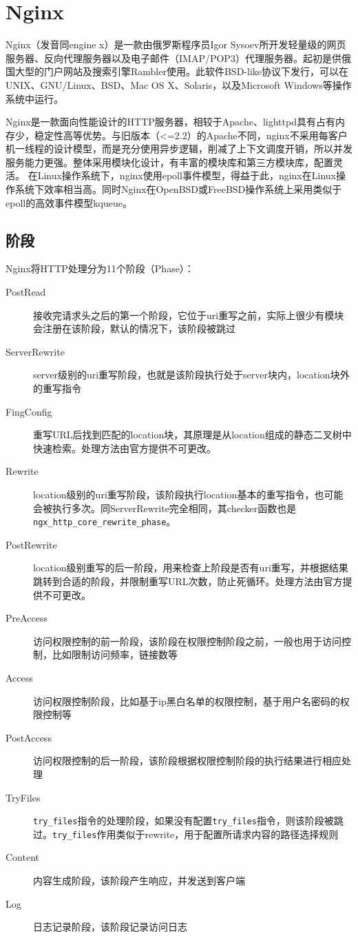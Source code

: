 \section{Nginx}
Nginx（发音同engine x）是一款由俄罗斯程序员Igor Sysoev所开发轻量级的网页服务器、反向代理服务器以及电子邮件（IMAP/POP3）代理服务器。起初是供俄国大型的门户网站及搜索引擎Rambler使用。此软件BSD-like协议下发行，可以在UNIX、GNU/Linux、BSD、Mac OS X、Solaris，以及Microsoft Windows等操作系统中运行。

Nginx是一款面向性能设计的HTTP服务器，相较于Apache、lighttpd具有占有内存少，稳定性高等优势。与旧版本（<=2.2）的Apache不同，nginx不采用每客户机一线程的设计模型，而是充分使用异步逻辑，削减了上下文调度开销，所以并发服务能力更强。整体采用模块化设计，有丰富的模块库和第三方模块库，配置灵活。 在Linux操作系统下，nginx使用epoll事件模型，得益于此，nginx在Linux操作系统下效率相当高。同时Nginx在OpenBSD或FreeBSD操作系统上采用类似于epoll的高效事件模型kqueue。

\subsection{阶段}
Nginx将HTTP处理分为11个阶段（Phase）：
\begin{description}
\item[PostRead]接收完请求头之后的第一个阶段，它位于uri重写之前，实际上很少有模块会注册在该阶段，默认的情况下，该阶段被跳过
\item[ServerRewrite]server级别的uri重写阶段，也就是该阶段执行处于server块内，location块外的重写指令
\item[FingConfig]重写URL后找到匹配的location块，其原理是从location组成的静态二叉树中快速检索。处理方法由官方提供不可更改。
\item[Rewrite]location级别的uri重写阶段，该阶段执行location基本的重写指令，也可能会被执行多次。同ServerRewrite完全相同，其checker函数也是\verb$ngx_http_core_rewrite_phase$。
\item[PostRewrite]location级别重写的后一阶段，用来检查上阶段是否有uri重写，并根据结果跳转到合适的阶段，并限制重写URL次数，防止死循环。处理方法由官方提供不可更改。
\item[PreAccess]访问权限控制的前一阶段，该阶段在权限控制阶段之前，一般也用于访问控制，比如限制访问频率，链接数等
\item[Access]访问权限控制阶段，比如基于ip黑白名单的权限控制，基于用户名密码的权限控制等
\item[PostAccess]访问权限控制的后一阶段，该阶段根据权限控制阶段的执行结果进行相应处理
\item[TryFiles]\verb$try_files$指令的处理阶段，如果没有配置\verb$try_files$指令，则该阶段被跳过。\verb$try_files$作用类似于rewrite，用于配置所请求内容的路径选择规则
\item[Content]内容生成阶段，该阶段产生响应，并发送到客户端
\item[Log]日志记录阶段，该阶段记录访问日志
\end{description}

